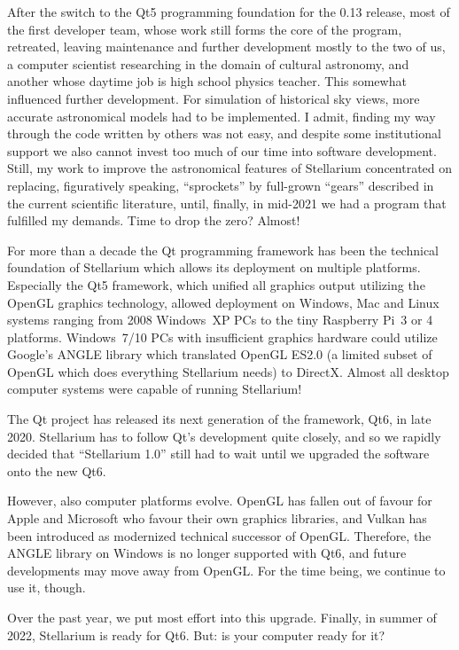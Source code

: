 After the switch to the Qt5 programming foundation for the 0.13
release, most of the first developer team, whose work still forms the
core of the program, retreated, leaving maintenance and further
development mostly to the two of us, a computer scientist researching
in the domain of cultural astronomy, and another whose daytime job is
high school physics teacher. This somewhat influenced further
development. For simulation of historical sky views, more accurate
astronomical models had to be implemented. I admit, finding my way
through the code written by others was not easy, and despite some
institutional support we also cannot invest too much of our time into
software development. Still, my work to improve the astronomical
features of Stellarium concentrated on replacing, figuratively
speaking, ``sprockets'' by full-grown ``gears'' described in the
current scientific literature, until, finally, in mid-2021 we had a
program that fulfilled my demands. Time to drop the zero? Almost!

For more than a decade the Qt programming framework has been the
technical foundation of Stellarium which allows its deployment on
multiple platforms. Especially the Qt5 framework, which unified all
graphics output utilizing the OpenGL graphics technology, allowed
deployment on Windows, Mac and Linux systems ranging from 2008
Windows~XP PCs to the tiny Raspberry Pi~3 or 4 platforms. Windows~7/10
PCs with insufficient graphics hardware could utilize Google's ANGLE
library which translated OpenGL ES2.0 (a limited subset of OpenGL
which does everything Stellarium needs) to DirectX. Almost all desktop
computer systems were capable of running Stellarium!

The Qt project has released its next generation of the framework, Qt6,
in late 2020. Stellarium has to follow Qt's development quite closely,
and so we rapidly decided that ``Stellarium 1.0'' still had to wait
until we upgraded the software onto the new Qt6.

However, also computer platforms evolve. OpenGL has fallen out of
favour for Apple and Microsoft who favour their own graphics
libraries, and Vulkan has been introduced as modernized technical
successor of OpenGL. Therefore, the ANGLE library on Windows is no
longer supported with Qt6, and future developments may move away from
OpenGL. For the time being, we continue to use it, though.

Over the past year, we put most effort into this upgrade. Finally, in
summer of 2022, Stellarium is ready for Qt6. But: is your computer
ready for it?

